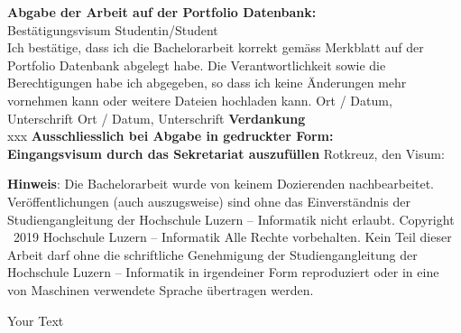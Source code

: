 \documentclass[10.5pt]{article}
\begin{document}
\newpage
\noindent
\textbf{Abgabe der Arbeit auf der Portfolio Datenbank:}\\
Best\"atigungsvisum Studentin/Student\\
Ich best\"atige, dass ich die Bachelorarbeit korrekt gem\"ass Merkblatt auf der Portfolio Datenbank abgelegt habe. Die Verantwortlichkeit sowie die Berechtigungen habe ich abgegeben, so dass ich keine \"Anderungen mehr vornehmen kann oder weitere Dateien hochladen kann. \newline \newline 
Ort / Datum, Unterschrift	\underline{\hspace*{4cm}} \newline \newline
{\color{red}Ort / Datum, Unterschrift	\underline{\hspace*{4cm}}} \newline \newline \newline
\textbf{Verdankung}\\
{\color{red}xxx} \newline \newline \newline
\noindent
{\textbf{Ausschliesslich bei Abgabe in gedruckter Form: \\
Eingangsvisum durch das Sekretariat auszuf\"ullen}} \newline \newline
Rotkreuz, den	\underline{\hspace*{4cm}} \hspace*{1cm}	Visum:	\underline{\hspace*{4cm}} \vspace*{10cm}











\noindent
{\textbf{Hinweis}}: Die Bachelorarbeit wurde von keinem Dozierenden nachbearbeitet. Ver\"offentlichungen (auch auszugsweise) sind ohne das Einverst\"andnis der Studiengangleitung der Hochschule Luzern -- Informatik nicht erlaubt. \newline \newline
Copyright \textcopyright\ {\color{red}2019} Hochschule Luzern -- Informatik \newline \newline
Alle Rechte vorbehalten. Kein Teil dieser Arbeit darf ohne die schriftliche Genehmigung der Studiengangleitung der Hochschule Luzern -- Informatik in irgendeiner Form reproduziert oder in eine von Maschinen verwendete Sprache \"ubertragen werden.

\newpage
{}
{\color{red}Your Text}
\end{document}
